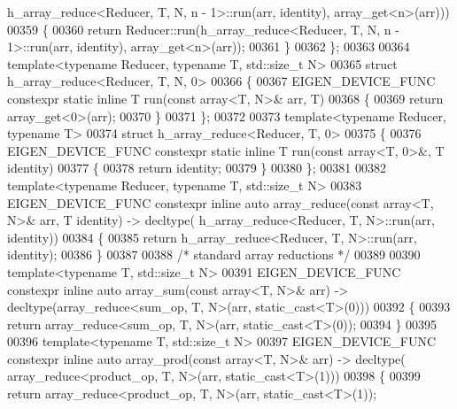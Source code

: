 \begin{DoxyCode}
      h\_array\_reduce<Reducer, T, N, n - 1>::run(arr, identity), array\_get<n>(arr)))
00359   \{
00360     \textcolor{keywordflow}{return} Reducer::run(h\_array\_reduce<Reducer, T, N, n - 1>::run(arr, identity), array\_get<n>(arr));
00361   \}
00362 \};
00363 
00364 \textcolor{keyword}{template}<\textcolor{keyword}{typename} Reducer, \textcolor{keyword}{typename} T, std::\textcolor{keywordtype}{size\_t} N>
00365 \textcolor{keyword}{struct }h\_array\_reduce<Reducer, T, N, 0>
00366 \{
00367   EIGEN\_DEVICE\_FUNC constexpr \textcolor{keyword}{static} \textcolor{keyword}{inline} T run(\textcolor{keyword}{const} array<T, N>& arr, T)
00368   \{
00369     \textcolor{keywordflow}{return} array\_get<0>(arr);
00370   \}
00371 \};
00372 
00373 \textcolor{keyword}{template}<\textcolor{keyword}{typename} Reducer, \textcolor{keyword}{typename} T>
00374 \textcolor{keyword}{struct }h\_array\_reduce<Reducer, T, 0>
00375 \{
00376   EIGEN\_DEVICE\_FUNC constexpr \textcolor{keyword}{static} \textcolor{keyword}{inline} T run(\textcolor{keyword}{const} array<T, 0>&, T identity)
00377   \{
00378     \textcolor{keywordflow}{return} identity;
00379   \}
00380 \};
00381 
00382 \textcolor{keyword}{template}<\textcolor{keyword}{typename} Reducer, \textcolor{keyword}{typename} T, std::\textcolor{keywordtype}{size\_t} N>
00383 EIGEN\_DEVICE\_FUNC constexpr \textcolor{keyword}{inline} \textcolor{keyword}{auto} array\_reduce(\textcolor{keyword}{const} array<T, N>& arr, T identity) -> decltype(
      h\_array\_reduce<Reducer, T, N>::run(arr, identity))
00384 \{
00385   \textcolor{keywordflow}{return} h\_array\_reduce<Reducer, T, N>::run(arr, identity);
00386 \}
00387 
00388 \textcolor{comment}{/* standard array reductions */}
00389 
00390 \textcolor{keyword}{template}<\textcolor{keyword}{typename} T, std::\textcolor{keywordtype}{size\_t} N>
00391 EIGEN\_DEVICE\_FUNC constexpr \textcolor{keyword}{inline} \textcolor{keyword}{auto} array\_sum(\textcolor{keyword}{const} array<T, N>& arr) -> decltype(array\_reduce<sum\_op,
       T, N>(arr, static\_cast<T>(0)))
00392 \{
00393   \textcolor{keywordflow}{return} array\_reduce<sum\_op, T, N>(arr, \textcolor{keyword}{static\_cast<}T\textcolor{keyword}{>}(0));
00394 \}
00395 
00396 \textcolor{keyword}{template}<\textcolor{keyword}{typename} T, std::\textcolor{keywordtype}{size\_t} N>
00397 EIGEN\_DEVICE\_FUNC constexpr \textcolor{keyword}{inline} \textcolor{keyword}{auto} array\_prod(\textcolor{keyword}{const} array<T, N>& arr) -> decltype(
      array\_reduce<product\_op, T, N>(arr, static\_cast<T>(1)))
00398 \{
00399   \textcolor{keywordflow}{return} array\_reduce<product\_op, T, N>(arr, \textcolor{keyword}{static\_cast<}T\textcolor{keyword}{>}(1));

\end{DoxyCode}
